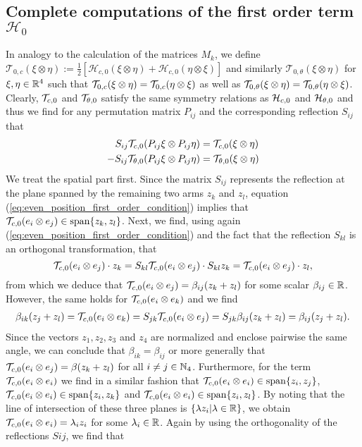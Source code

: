\subsection{Complete computations of the first order term $\mathcal{H}_0$}
 
 In analogy to the calculation of the matrices $M_k$, we define $\mathcal{T}_{0, c}(\xi \otimes \eta) := \tfrac{1}{2}  [\mathcal{H}_{c,0}(\xi \otimes \eta) + \mathcal{H}_{c,0}(\eta \otimes \xi)]$ and similarly $\mathcal{T}_{0, \theta}(\xi \otimes \eta)$ for $\xi, \eta \in \mathbb{R}^4$ such that $\mathcal{T}_{0,c}(\xi \otimes \eta) = \mathcal{T}_{0,c}(\eta \otimes \xi)$ as well as $\mathcal{T}_{0,\theta}(\xi \otimes \eta) = \mathcal{T}_{0,\theta}(\eta \otimes \xi)$. Clearly, $\mathcal{T}_{c,0}$ and $\mathcal{T}_{\theta,0}$ satisfy the same symmetry relations as $\mathcal{H}_{c,0}$ and $\mathcal{H}_{\theta,0}$ and thus we find for any permutation matrix $P_{ij}$ and the corresponding reflection $S_{ij}$ that
\begin{align}
\label{eq:even_position_first_order_condition}
 S_{ij}\mathcal{T}_{c,0}(P_{ij} \xi \otimes P_{ij} \eta) &= \mathcal{T}_{c,0}(\xi \otimes \eta)\\
 \label{eq:even_angle_first_order_condition}
  -S_{ij}\mathcal{T}_{\theta,0}(P_{ij} \xi \otimes P_{ij} \eta) &= \mathcal{T}_{\theta,0}(\xi \otimes \eta)
\end{align}
We treat the spatial part first. Since the matrix $S_{ij}$ represents the reflection at the plane spanned by the remaining two arms $z_k$ and $z_l$, equation (\ref{eq:even_position_first_order_condition}) implies that $\mathcal{T}_{c,0}(e_i \otimes e_j) \in \operatorname{span}\{z_k, z_l\}$. Next, we find, using again (\ref{eq:even_position_first_order_condition}) and the fact that the reflection $S_{kl}$ is an orthogonal transformation, that
\begin{equation}
\mathcal{T}_{c,0}(e_i \otimes e_j) \cdot z_k = S_{kl}\mathcal{T}_{c,0}(e_i \otimes e_j) \cdot S_{kl} z_k = \mathcal{T}_{c,0}(e_i \otimes e_j) \cdot z_l,
\end{equation}
from which we deduce that $\mathcal{T}_{c,0}(e_i \otimes e_j) = \beta_{ij} (z_k + z_l)$ for some scalar $\beta_{ij} \in \mathbb{R}$. However, the same holds for $\mathcal{T}_{c,0}(e_i \otimes e_k)$ and we find
\begin{align}
\beta_{ik} (z_j + z_l) = \mathcal{T}_{c,0}(e_i \otimes e_k) = S_{jk} \mathcal{T}_{c,0}(e_i \otimes e_j) = S_{jk} \beta_{ij} (z_k + z_l) = \beta_{ij} (z_j + z_l).
\end{align}
Since the vectors $z_1, z_2, z_3$ and $z_4$ are normalized and enclose pairwise the same angle, we can conclude that $\beta_{ik} = \beta_{ij}$ or more generally that $\mathcal{T}_{c,0}(e_i \otimes e_j) = \beta (z_k + z_l)$ for all $i \neq j \in \mathbb{N}_4$. Furthermore, for the term $\mathcal{T}_{c,0}(e_i \otimes e_i)$ we find in a similar fashion that $\mathcal{T}_{c,0}(e_i \otimes e_i) \in \operatorname{span}\{z_i, z_j\}$, $\mathcal{T}_{c,0}(e_i \otimes e_i) \in \operatorname{span}\{z_i, z_k\}$ and $\mathcal{T}_{c,0}(e_i \otimes e_i) \in \operatorname{span}\{z_i, z_l\}$. By noting that the line of intersection of these three planes is $\{\lambda z_i | \lambda \in\mathbb{R}\}$, we obtain $\mathcal{T}_{c,0}(e_i \otimes e_i) = \lambda_i z_i$ for some $\lambda_i \in \mathbb{R}$. Again by using the orthogonality of the reflections $Sij$, we find that
